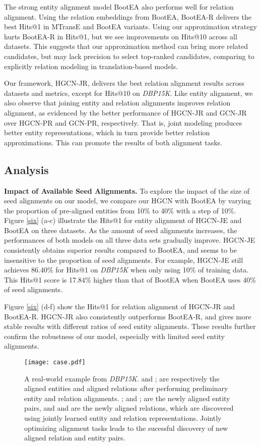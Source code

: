 \documentclass[11pt,a4paper]{article}
\newcommand\cparagraph[1]{\vspace{1mm}\noindent\textbf{#1.}}
\begin{document}
The strong entity alignment model BootEA also performs well for relation alignment.
Using the relation embeddings from BootEA, BootEA-R
delivers the best Hits@1 in MTransE and BootEA variants. Using our approximation strategy hurts BootEA-R in Hits@1, but we see improvements on Hits@10 across all datasets. This suggests that our approximation method can bring more related candidates, but may lack precision to select top-ranked candidates, comparing to explicitly relation modeling in translation-based models.


Our framework, HGCN-JR, delivers the best relation alignment results across datasets and metrics, except for Hits@10 on \textit{DBP15K}. Like entity alignment, we also observe
that joining entity and relation alignments improves relation alignment, as evidenced by the better performance of HGCN-JR and GCN-JR
over HGCN-PR and GCN-PR, respectively. That is, joint modeling produces better entity representations, which in turn provide better relation approximations. This can promote the results of both alignment tasks.


\subsection{Analysis\label{sec:prioralignmentdata}}
\cparagraph{Impact of Available Seed Alignments}
To explore the impact of the size of seed alignments on our model, we compare our HGCN with BootEA by varying the
proportion of pre-aligned entities from 10\% to 40\% with a step of 10\%. Figure \ref{six} (a-c) illustrate the Hits@1 for entity alignment of HGCN-JE and BootEA on three datasets. As the amount of seed alignments increases, the performances of both models on all three data sets gradually improve. HGCN-JE consistently obtains superior results compared to BootEA, and seems to be
insensitive to the proportion of seed alignments. For example, HGCN-JE still achieves 86.40\% for Hits@1 on \textit{DBP15K} when only using 10\% of training data. This Hits@1 score is 17.84\% higher than that of BootEA when BootEA uses 40\% of seed alignments.

Figure \ref{six} (d-f) show the Hits@1 for relation alignment of HGCN-JR and BootEA-R. HGCN-JR also consistently outperforms BootEA-R, and gives more stable results with different ratios of seed entity alignments.
These results further confirm the robustness of our model, especially with limited seed entity alignments.

\begin{figure}[t!]
	\centering
	\texttt{[image: case.pdf]}
	\caption{A real-world example from \textit{DBP15K}.  and ;  are respectively the aligned entities and aligned relations after performing preliminary entity and relation alignments. ;  and ;  are the newly aligned entity pairs, and  and  are the newly aligned relations, which are discovered using jointly learned entity and relation representations. Jointly optimizing alignment tasks leads to the sucessful discovery of new aligned relation and entity pairs.}
	\label{case}
\end{figure}
\end{document}
